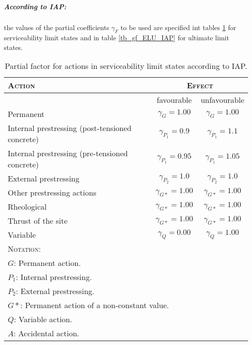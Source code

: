 \subparagraph{According to IAP:} the values of the partial coefficients $\gamma_F$ to be used are specified int tables \ref{tb_gf_ELS_IAP} for serviceability limit states and in table \ref{tb_gf_ELU_IAP} for ultimate limit states.

\begin{table}
\begin{center}
\begin{footnotesize}
\begin{tabular}{|l|c|c|}
\hline
\textsc{Action} & \multicolumn{2}{|c|}{\textsc{Effect}} \\
\hline
 & favourable & unfavourable \\
\hline
Permanent  & $\gamma_G= 1.00$ &  $\gamma_G= 1.00$ \\
\hline
Internal prestressing (post-tensioned concrete) & $\gamma_{P_1}= 0.9$ &  $\gamma_{P_1}= 1.1$ \\
Internal prestressing (pre-tensioned concrete) & $\gamma_{P_1}= 0.95$ &  $\gamma_{P_1}= 1.05$ \\ 
\hline
External prestressing & $\gamma_{P_2}= 1.0$ &  $\gamma_{P_2}= 1.0$ \\
\hline
Other prestressing actions & $\gamma_{G*}= 1.00$ &  $\gamma_{G*}= 1.00$ \\
\hline
Rheological & $\gamma_{G*}= 1.00$ &  $\gamma_{G*}= 1.00$ \\
\hline
Thrust of the site & $\gamma_{G*}= 1.00$ &  $\gamma_{G*}= 1.00$ \\
\hline
Variable & $\gamma_Q= 0.00$ &  $\gamma_Q= 1.00$ \\
\hline
\multicolumn{3}{|l|}{\textsc{Notation:}} \\
\hline
\multicolumn{3}{|l|}{$G$: Permanent action.} \\
\multicolumn{3}{|l|}{$P_1$: Internal prestressing.} \\
\multicolumn{3}{|l|}{$P_2$: External prestressing.} \\
\multicolumn{3}{|l|}{$G*$: Permanent action of a non-constant value.} \\
\multicolumn{3}{|l|}{$Q$: Variable action.} \\
\multicolumn{3}{|l|}{$A$: Accidental action.} \\
\hline
\end{tabular}
\end{footnotesize}
\caption{Partial factor for actions in serviceability limit states according to IAP.} \label{tb_gf_ELS_IAP}
\end{center}
\end{table}

